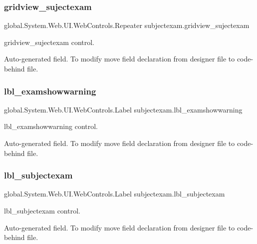 \subsubsection{\texorpdfstring{gridview\_sujectexam}{gridview\_sujectexam}}
{\footnotesize\ttfamily global.\+System.\+Web.\+U\+I.\+Web\+Controls.\+Repeater subjectexam.\+gridview\+\_\+sujectexam\hspace{0.3cm}{\ttfamily [protected]}}



gridview\+\_\+sujectexam control. 

Auto-\/generated field. To modify move field declaration from designer file to code-\/behind file. \mbox{\label{classsubjectexam_a76a36d2d5027fa34bc200369ecd6b774}} 
\subsubsection{\texorpdfstring{lbl\_examshowwarning}{lbl\_examshowwarning}}
{\footnotesize\ttfamily global.\+System.\+Web.\+U\+I.\+Web\+Controls.\+Label subjectexam.\+lbl\+\_\+examshowwarning\hspace{0.3cm}{\ttfamily [protected]}}



lbl\+\_\+examshowwarning control. 

Auto-\/generated field. To modify move field declaration from designer file to code-\/behind file. \mbox{\label{classsubjectexam_a54e8c808d5166ccec18cdb8a1c9d5570}} 
\subsubsection{\texorpdfstring{lbl\_subjectexam}{lbl\_subjectexam}}
{\footnotesize\ttfamily global.\+System.\+Web.\+U\+I.\+Web\+Controls.\+Label subjectexam.\+lbl\+\_\+subjectexam\hspace{0.3cm}{\ttfamily [protected]}}



lbl\+\_\+subjectexam control. 

Auto-\/generated field. To modify move field declaration from designer file to code-\/behind file. \mbox{\label{classsubjectexam_ad907d6750b00077c57e06fd4a3b97d33}} 
